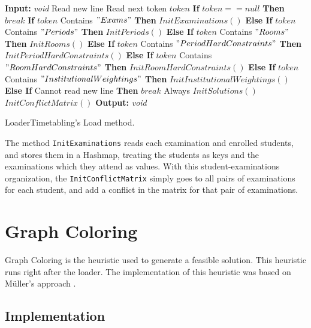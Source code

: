 \begin{algorithm}[b!]
\begin{algorithmic}
\State \textbf{Input:} \textit{void} 
\State Read new line
\Repeat
	\State Read next token $token$
	\State \textbf{If} $token == null$ \textbf{Then} $break$ 
	\State \textbf{If} $token$ Contains $"Exams"$ \textbf{Then} $InitExaminations()$
	\State \textbf{Else If} $token$ Contains $"Periods"$ \textbf{Then} $InitPeriods()$
	\State \textbf{Else If} $token$ Contains $"Rooms"$ \textbf{Then} $InitRooms()$
	\State \textbf{Else If} $token$ Contains $"PeriodHardConstraints"$ \textbf{Then} $InitPeriodHardConstraints()$
	\State \textbf{Else If} $token$ Contains $"RoomHardConstraints"$ \textbf{Then} $InitRoomHardConstraints()$
	\State \textbf{Else If} $token$ Contains $"InstitutionalWeightings"$ \textbf{Then} $InitInstitutionalWeightings()$
	\State \textbf{Else If} Cannot read new line \textbf{Then} $break$ 
\Until Always
\State $InitSolutions()$
\State $InitConflictMatrix()$
\State \textbf{Output:} \textit{void} 
\end{algorithmic}
\caption{LoaderTimetabling's Load method.}
\label{alg:Load}
\end{algorithm}The method \verb+InitExaminations+ reads each examination and enrolled students, and stores them in a Hashmap, treating the students as keys and the examinations which they attend as values. With this student-examinations organization, the \verb+InitConflictMatrix+ simply goes to all pairs of examinations for each student, and add a conflict in the matrix for that pair of examinations.

\section{Graph Coloring}
\label{sec:GraphColoring}

Graph Coloring is the heuristic used to generate a feasible solution. This heuristic runs right after the loader. The implementation of this heuristic was based on M\"{u}ller's approach \cite{Mueller2009}.\\

\subsection{Implementation}

